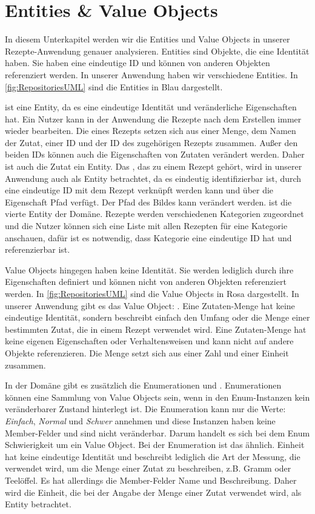 \section{Entities \& Value Objects}
In diesem Unterkapitel werden wir die Entities und Value Objects in unserer Rezepte-Anwendung genauer analysieren. Entities sind Objekte, die eine Identität haben. Sie haben eine eindeutige ID und können von anderen Objekten referenziert werden. In unserer Anwendung haben wir verschiedene Entities. In \autoref{fig:RepositoriesUML} sind die Entities in Blau dargestellt.

 ist eine Entity, da es eine eindeutige Identität und veränderliche Eigenschaften hat. Ein Nutzer kann in der Anwendung die Rezepte nach dem Erstellen immer wieder bearbeiten. Die  eines Rezepts setzen sich aus einer Menge, dem Namen der Zutat, einer ID und der ID des zugehörigen Rezepts zusammen. Außer den beiden IDs können auch die Eigenschaften von Zutaten verändert werden. Daher ist auch die Zutat ein Entity. Das , das zu einem Rezept gehört, wird in unserer Anwendung auch als Entity betrachtet, da es eindeutig identifizierbar ist, durch eine eindeutige ID mit dem Rezept verknüpft werden kann und über die Eigenschaft Pfad verfügt. Der Pfad des Bildes kann verändert werden.  ist die vierte Entity der Domäne. Rezepte werden verschiedenen Kategorien zugeordnet und die Nutzer können sich eine Liste mit allen Rezepten für eine Kategorie anschauen, dafür ist es notwendig, dass Kategorie eine eindeutige ID hat und referenzierbar ist.

Value Objects hingegen haben keine Identität. Sie werden lediglich durch ihre Eigenschaften definiert und können nicht von anderen Objekten referenziert werden. In \autoref{fig:RepositoriesUML} sind die Value Objects in Rosa dargestellt. In unserer Anwendung gibt es das Value Object: . Eine Zutaten-Menge hat keine eindeutige Identität, sondern beschreibt einfach den Umfang oder die Menge einer bestimmten Zutat, die in einem Rezept verwendet wird. Eine Zutaten-Menge hat keine eigenen Eigenschaften oder Verhaltensweisen und kann nicht auf andere Objekte referenzieren. Die Menge setzt sich aus einer Zahl und einer Einheit zusammen. 

In der Domäne gibt es zusätzlich die Enumerationen  und . Enumerationen können eine Sammlung von Value Objects sein, wenn in den Enum-Instanzen kein veränderbarer Zustand hinterlegt ist. Die Enumeration  kann nur die Werte: \emph{Einfach}, \emph{Normal} und \emph{Schwer} annehmen und diese Instanzen haben keine Member-Felder und sind nicht veränderbar. Darum handelt es sich bei dem Enum Schwierigkeit um ein Value Object. Bei der Enumeration  ist das ähnlich. Einheit hat keine eindeutige Identität und beschreibt lediglich die Art der Messung, die verwendet wird, um die Menge einer Zutat zu beschreiben, z.B. Gramm oder Teelöffel. Es hat allerdings die Member-Felder Name und Beschreibung. Daher wird die Einheit, die bei der Angabe der Menge einer Zutat verwendet wird, als Entity betrachtet.


